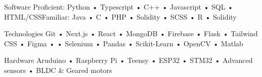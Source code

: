 

\begin{cvskills}

  \cvskill
    {Software} %
    {Proficient: Python • Typescript • C++ • Javascript • SQL • HTML/CSS\space\space\space Familiar: Java • C • PHP • Solidity • SCSS • R • Solidity}%

  \cvskill
    {Technologies} %
    {Git • Next.js • React • MongoDB • Firebase • Flask • Tailwind CSS • Figma •  • Selenium • Pandas • Scikit-Learn • OpenCV • Matlab } %

  \cvskill
    {Hardware} %
    {Aruduino • Raspberry Pi • Teensy • ESP32 • STM32 • Advanced sensors • BLDC \& Geared motors} %

\end{cvskills}
